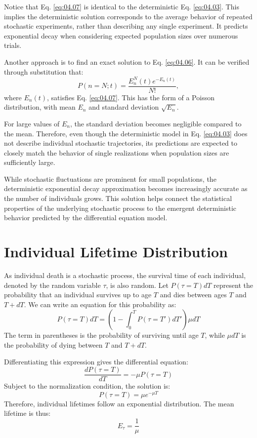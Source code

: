 Notice that Eq. \eqref{eq:04.07} is identical to the deterministic Eq. \eqref{eq:04.03}. This implies the deterministic solution corresponds to the average behavior of repeated stochastic experiments, rather than describing any single experiment. It predicts exponential decay when considering expected population sizes over numerous trials.

Another approach is to find an exact solution to Eq. \eqref{eq:04.06}. It can be verified through substitution that:
\begin{equation*}
P(n=N;t) = \frac{E_n^N(t)e^{-E_n(t)}}{N!},
\end{equation*}
where $E_n(t)$, satisfies Eq. \eqref{eq:04.07}. This has the form of a Poisson distribution, with mean $E_n$ and standard deviation $\sqrt{E_n}$.

For large values of $E_n$, the standard deviation becomes negligible compared to the mean. Therefore, even though the deterministic model in Eq. \eqref{eq:04.03} does not describe individual stochastic trajectories, its predictions are expected to closely match the behavior of single realizations when population sizes are sufficiently large.

While stochastic fluctuations are prominent for small populations, the deterministic exponential decay approximation becomes increasingly accurate as the number of individuals grows. This solution helps connect the statistical properties of the underlying stochastic process to the emergent deterministic behavior predicted by the differential equation model.

\section{Individual Lifetime Distribution}

As individual death is a stochastic process, the survival time of each individual, denoted by the random variable $\tau$, is also random. Let $P(\tau=T)dT$ represent the probability that an individual survives up to age $T$ and dies between ages $T$ and $T+dT$. We can write an equation for this probability as:
\begin{equation*}
P(\tau=T)dT = \left(1 - \int_0^T P(\tau=T')dT' \right)\mu dT
\end{equation*}
The term in parentheses is the probability of surviving until age $T$, while $\mu dT$ is the probability of dying between $T$ and $T+dT$.

Differentiating this expression gives the differential equation:
\begin{equation*}
\frac{dP(\tau=T)}{dT} = -\mu P(\tau=T)
\end{equation*}
Subject to the normalization condition, the solution is:
\begin{equation*}
P(\tau=T) = \mu e^{-\mu T}
\end{equation*}
Therefore, individual lifetimes follow an exponential distribution. The mean lifetime is thus:
\begin{equation*}
E_\tau = \frac{1}{\mu}
\end{equation*}

